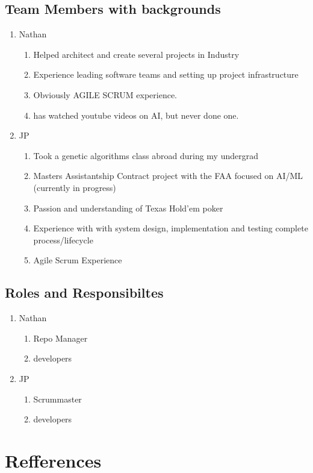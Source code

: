 \documentclass[11pt]{article}
\begin{document}
\subsection{Team Members with backgrounds}
\begin{enumerate}
\item Nathan 
  \begin{enumerate}
  \item Helped architect and create several projects in Industry
  \item Experience leading software teams and setting up project infrastructure
  \item Obviously AGILE SCRUM experience.
  \item has watched youtube videos on AI, but never done one.
  \end{enumerate}
\item JP
  \begin{enumerate}
  \item Took a genetic algorithms class abroad during my undergrad
  \item Masters Assistantship Contract project with the FAA focused on AI/ML (currently in progress)
  \item Passion and understanding of Texas Hold'em poker
  \item Experience with with system design, implementation and testing complete process/lifecycle
  \item Agile Scrum Experience
  \end{enumerate}
\end{enumerate}
\subsection{Roles and Responsibiltes}
\begin{enumerate}
\item Nathan
  \begin{enumerate}
  \item Repo Manager
  \item developers
  \end{enumerate}
\item JP
  \begin{enumerate}
    \item Scrummaster
    \item developers
  \end{enumerate}
\end{enumerate}

\section{Refferences}
\printbibliography
\end{document}
